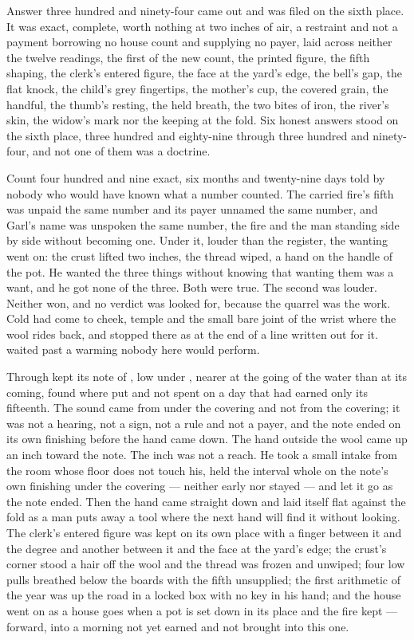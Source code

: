 Answer three hundred and ninety-four came out and was filed on the sixth place. It was exact, complete, worth nothing at two inches of air, a restraint and not a payment borrowing no house count and supplying no payer, laid across neither the twelve readings, the first of the new count, the printed figure, the fifth shaping, the clerk's entered figure, the face at the yard's edge, the bell's gap, the flat knock, the child's grey fingertips, the mother's cup, the covered grain, the handful, the thumb's resting, the held breath, the two bites of iron, the river's skin, the widow's mark nor the keeping at the fold. Six honest answers stood on the sixth place, three hundred and eighty-nine through three hundred and ninety-four, and not one of them was a doctrine.

Count four hundred and nine exact, six months and twenty-nine days told by nobody who would have known what a number counted. The carried fire's fifth was unpaid the same number and its payer unnamed the same number, and Garl's name was unspoken the same number, the fire and the man standing side by side without becoming one. Under it, louder than the register, the wanting went on: the crust lifted two inches, the thread wiped, a hand on the handle of the pot. He wanted the three things without knowing that wanting them was a want, and he got none of the three. Both were true. The second was louder. Neither won, and no verdict was looked for, because the quarrel was the work. Cold had come to cheek, temple and the small bare joint of the wrist where the wool rides back, and stopped there as at the end of a line written out for it.  waited past a warming nobody here would perform.

Through   kept its note of , low under , nearer at the going of the water than at its coming, found where put and not spent on a day that had earned only its fifteenth. The sound came from under the covering and not from the covering; it was not a hearing, not a sign, not a rule and not a payer, and the note ended on its own finishing before the hand came down. The hand outside the wool came up an inch toward the note. The inch was not a reach. He took a small intake from the room whose floor does not touch his, held the interval whole on the note's own finishing under the covering --- neither early nor stayed --- and let it go as the note ended. Then the hand came straight down and laid itself flat against the fold as a man puts away a tool where the next hand will find it without looking. The clerk's entered figure was kept on its own place with a finger between it and the degree and another between it and the face at the yard's edge; the crust's corner stood a hair off the wool and the thread was frozen and unwiped; four low pulls breathed below the boards with the fifth unsupplied; the first arithmetic of the year was up the road in a locked box with no key in his hand; and the house went on as a house goes when a pot is set down in its place and the fire kept --- forward, into a morning not yet earned and not brought into this one.
